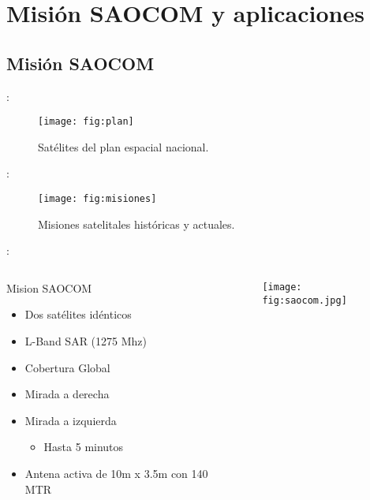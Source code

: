 \section{Misión SAOCOM y aplicaciones}
\subsection{Misión SAOCOM}

\begin{frame}{\secname : \subsecname}
  \begin{figure}
    \centering
    \texttt{[image: fig:plan]}
    \caption{Satélites del plan espacial nacional.}
    \label{}
  \end{figure}
\end{frame}

\begin{frame}{\secname : \subsecname}
  \begin{figure}
    \centering
    \texttt{[image: fig:misiones]}
    \caption{Misiones satelitales históricas y actuales.}
    \label{}
  \end{figure}
\end{frame}



\begin{frame}{\secname : \subsecname}
  \begin{columns}
    \begin{column}{0.6\textwidth}
     \begin{block}{Mision SAOCOM}
\begin{itemize}
  \item Dos satélites idénticos
  \item L-Band SAR (1275 Mhz)
  \item Cobertura Global
  \item Mirada a derecha
  \item Mirada a izquierda
  \begin{itemize}
    \item Hasta 5 minutos
  \end{itemize}
  \item Antena activa de 10m x 3.5m con 140 MTR
\end{itemize}
     \end{block}
    \end{column}
    \begin{column}{0.4\textwidth}  %
      \begin{figure}
        \centering
        \texttt{[image: fig:saocom.jpg]}
        \caption*{}
        \label{}
      \end{figure}
    \end{column}
    \end{columns}

\end{frame}

